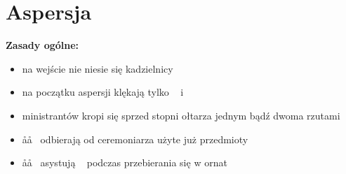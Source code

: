 \section{Aspersja}
	

	
		\textbf{Zasady ogólne:}
		\begin{itemize}
			\item na wejście nie niesie się kadzielnicy
			\item na początku aspersji klękają tylko \ii~ i \cc~
			\item ministrantów kropi się sprzed stopni ołtarza jednym bądź dwoma rzutami
			\item \aa\aa~ odbierają od ceremoniarza użyte już przedmioty
			\item \aa\aa~ asystują \ii~ podczas przebierania się w ornat
		\end{itemize}
	
		\bigskip
	
